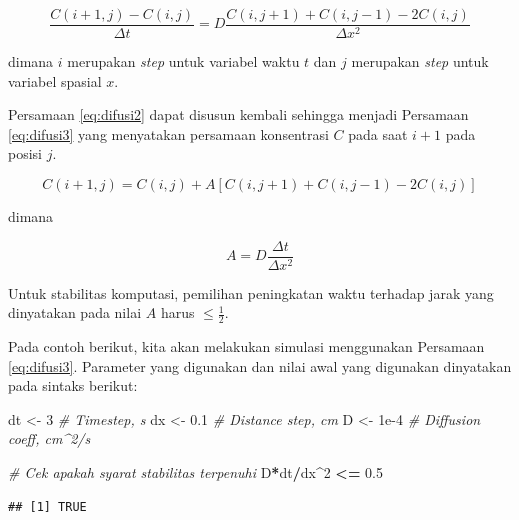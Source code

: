 \documentclass[]{book}
\newenvironment{Shaded}{\begin{snugshade}}{\end{snugshade}}
\newcommand{\CommentTok}[1]{\textcolor[rgb]{0.56,0.35,0.01}{\textit{#1}}}
\newcommand{\DecValTok}[1]{\textcolor[rgb]{0.00,0.00,0.81}{#1}}
\newcommand{\FloatTok}[1]{\textcolor[rgb]{0.00,0.00,0.81}{#1}}
\newcommand{\NormalTok}[1]{#1}
\newcommand{\OperatorTok}[1]{\textcolor[rgb]{0.81,0.36,0.00}{\textbf{#1}}}
\newcommand{\StringTok}[1]{\textcolor[rgb]{0.31,0.60,0.02}{#1}}
\theoremstyle{definition}
\theoremstyle{definition}
\theoremstyle{definition}
\theoremstyle{remark}
\begin{document}
\begin{equation}
\frac{C\left(i+1,j\right)-C\left(i,j\right)}{\Delta t}=D\frac{C\left(i,j+1\right)+C\left(i,j-1\right)-2C\left(i,j\right)}{\Delta x^2}
  \label{eq:difusi2}
\end{equation}

dimana \(i\) merupakan \emph{step} untuk variabel waktu \(t\) dan \(j\) merupakan \emph{step} untuk variabel spasial \(x\).

Persamaan \eqref{eq:difusi2} dapat disusun kembali sehingga menjadi Persamaan \eqref{eq:difusi3} yang menyatakan persamaan konsentrasi \(C\) pada saat \(i+1\) pada posisi \(j\).

\begin{equation}
C\left(i+1,j\right)=C\left(i,j\right)+A\left[C\left(i,j+1\right)+C\left(i,j-1\right)-2C\left(i,j\right)\right]
  \label{eq:difusi3}
\end{equation}

dimana

\begin{equation}
A=D\frac{\Delta t}{\Delta x^2}
  \label{eq:difusi4}
\end{equation}

Untuk stabilitas komputasi, pemilihan peningkatan waktu terhadap jarak yang dinyatakan pada nilai \(A\) harus \(\le\frac{1}{2}\).

Pada contoh berikut, kita akan melakukan simulasi menggunakan Persamaan \eqref{eq:difusi3}. Parameter yang digunakan dan nilai awal yang digunakan dinyatakan pada sintaks berikut:

\begin{Shaded}
\begin{Highlighting}[]
\NormalTok{dt    <-}\StringTok{ }\DecValTok{3}                \CommentTok{# Timestep, s}
\NormalTok{dx    <-}\StringTok{ }\FloatTok{0.1}              \CommentTok{# Distance step, cm}
\NormalTok{D     <-}\StringTok{ }\FloatTok{1e-4}             \CommentTok{# Diffusion coeff, cm^2/s}

\CommentTok{# Cek apakah syarat stabilitas terpenuhi}
\NormalTok{D}\OperatorTok{*}\NormalTok{dt}\OperatorTok{/}\NormalTok{dx}\OperatorTok{^}\DecValTok{2} \OperatorTok{<=}\StringTok{ }\FloatTok{0.5}
\end{Highlighting}
\end{Shaded}

\begin{verbatim}
## [1] TRUE
\end{verbatim}
\end{document}
